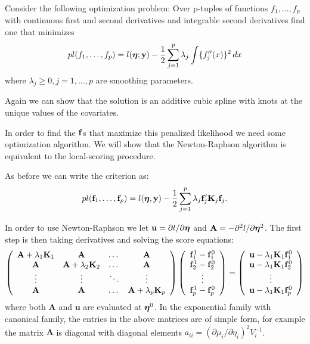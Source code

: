 Consider the following optimization problem: Over p-tuples of
functions $f_1,\dots,f_p$ with continuous first and second derivatives and
integrable second derivatives find one that minimizes
\[
pl(f_1,\dots,f_p) = l(\mbox{\boldmath $\eta$\unboldmath};{\mathbf y}) - \frac{1}{2}\sum_{j=1}^p \lambda_j
\int \{f_j''(x)\}^2 \, dx
\]
where $\lambda_j \geq 0, j=1,\dots,p$ are smoothing parameters.

Again we can show that 
the solution is an additive cubic spline with knots at the unique
values of the covariates.  


In order to find the ${\mathbf f}$s that maximize this penalized likelihood
we need some optimization algorithm. We will show that the
Newton-Raphson algorithm is equivalent to the local-scoring
procedure. 



As before we can write the criterion as:
\[
pl({\mathbf f}_1,\dots,{\mathbf f}_p) = l(\mbox{\boldmath $\eta$\unboldmath},{\mathbf y}) - \frac{1}{2} \sum_{j=1}^p
\lambda_j {\mathbf f}_j'\mathbf{K}_j {\mathbf f}_j.
\]

In order to use Newton-Raphson we
let $\mathbf{u} = \partial l / \partial{\mbox{\boldmath $\eta$\unboldmath}}$ and $\mathbf{A} = -
\partial^2 l/ \partial \mbox{\boldmath $\eta$\unboldmath}^2$. The first step is then taking
derivatives and solving the 
score equations:
\[
\left(
\begin{array}{cccc}
\mathbf{A} + \lambda_1 \mathbf{K}_1&\mathbf{A}&\dots&\mathbf{A}\\
\mathbf{A}&\mathbf{A} + \lambda_2 \mathbf{K}_2&\dots&\mathbf{A}\\
\vdots&\vdots&\ddots&\vdots\\
\mathbf{A}&\mathbf{A}&\dots&\mathbf{A}+\lambda_p \mathbf{K}_p
\end{array}
\right)
\left(
\begin{array}{c}
{\mathbf f}_1^1 - {\mathbf f}_1^0\\
{\mathbf f}_2^1 - {\mathbf f}_2^0\\
\vdots\\
{\mathbf f}_p^1 - {\mathbf f}_p^0
\end{array}
\right)
=
\left(
\begin{array}{c}
\mathbf{u} - \lambda_1 \mathbf{K}_1 {\mathbf f}_1^0\\
\mathbf{u} - \lambda_1 \mathbf{K}_1 {\mathbf f}_2^0\\
\vdots\\
\mathbf{u} - \lambda_1 \mathbf{K}_1 {\mathbf f}_p^0
\end{array}
\right)
\]
where both $\mathbf{A}$ and $\mathbf{u}$ are evaluated at $\mbox{\boldmath $\eta$\unboldmath}^0$. In
the exponential family with canonical family, the entries in the above
matrices are of simple form, for example the matrix $\mathbf{A}$ is
diagonal with diagonal elements $a_{ii} = (\partial \mu_i / \partial
\eta_i)^2 V_i^{-1}$.

